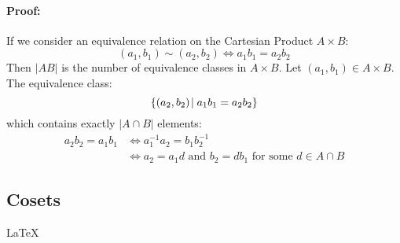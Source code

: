 \documentclass[12pt, oneside]{book}
\begin{document}
\paragraph{Proof:} If we consider an equivalence relation on the Cartesian Product \( A \times B \):
\[ \left( a_1, b_1 \right) \sim \left( a_2, b_2 \right) \Leftrightarrow a_1 b_1 = a_2 b_2 \]
Then \(\left|AB\right|\) is the number of equivalence classes in \(A \times B\).
Let \( \left(a_1, b_1\right) \in A \times B \).
The equivalence class:
\[ \{ \left(a_2, b_2\right) \: \vline \: a_1 b_1 = a_2 b_2 \} \]
which contains exactly \(\left|A \cap B\right|\) elements:
\begin{align*}
    a_2 b_2 = a_1 b_1 &\Leftrightarrow a_1^{-1} a_2 = b_1 b_2^{-1} \\
    &\Leftrightarrow a_2 = a_1 d \text{ and } b_2 = d b_1 \text{ for some } d \in A \cap B
\end{align*} 

\subsection{Cosets}
\LaTeX
\end{document}
